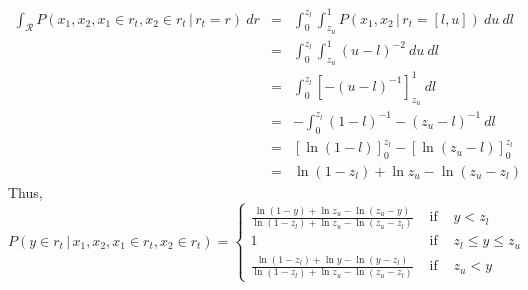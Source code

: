 \documentclass[doc]{apa6}
\newcommand{\p}{P}
\newcommand{\rt}{{r_t}}
\newcommand{\condon}{\, | \,}
\begin{document}
\begin{eqnarray}
\int_{\mathcal{R}} \p(x_1, x_2, x_1 \in \rt, x_2 \in \rt \condon  \rt=r) \ dr &=& \int_0^{z_l} \int_{z_u}^1 \p(x_1, x_2 \condon  \rt = [l,u]) \ du \ dl \nonumber \\
&=& \int_0^{z_l} \int_{z_u}^1 (u-l)^{-2} \ du \ dl \nonumber \\
&=& \int_0^{z_l} \left[ -(u-l)^{-1} \right]_{z_u}^1 \ dl \nonumber \\
&=& - \int_0^{z_l} (1-l)^{-1} - (z_u -l)^{-1} \ dl \nonumber \\
&=& \left[ \ln (1-l) \right]^{z_l}_0 - \left[ \ln (z_u-l) \right]^{z_l}_0 \nonumber \\
&=& \ln(1-z_l) + \ln z_u - \ln (z_u -z_l)
\end{eqnarray}
Thus,
\begin{equation}
\p(y \in \rt \condon  x_1, x_2, x_1\in \rt, x_2\in \rt) = \left\{ \begin{array}{rcl} \displaystyle\frac{\ln(1-y) + \ln z_u - \ln (z_u -y)}{\ln(1-z_l) + \ln z_u - \ln (z_u -z_l)} & \mbox{ if } & y<z_l \\ 1 & \mbox{ if } & z_l \leq y \leq z_u \\  \displaystyle\frac{\ln(1-z_l) + \ln y - \ln (y -z_l) }{\ln(1-z_l) + \ln z_u - \ln (z_u -z_l) } & \mbox{ if } & z_u < y  \end{array} \right.
\end{equation}
\end{document}

